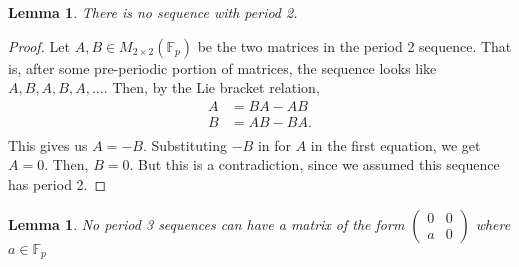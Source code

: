 \documentclass[12pt, letterpaper]{article}
\newtheorem{lemma}[theorem]{Lemma}
\theoremstyle{definition}
\newcommand{\F}{\mathbb{F}}
\newcommand{\M}{M_{2\times 2}(\mathbb{F}_p)}
\begin{document}
\begin{lemma}
There is no sequence with period 2.
\end{lemma}

\begin{proof}
Let $A,B \in \M$ be the two matrices in the period 2 sequence. That is, after some pre-periodic portion of matrices, the sequence looks like $A,B,A,B,A,\dots$. Then, by the Lie bracket relation,
\begin{align*}
A &= BA-AB \\
B &= AB-BA. \\
\end{align*}
This gives us $A=-B$. Substituting $-B$ in for $A$ in the first equation, we get $A=0$. Then, $B=0$. But this is a contradiction, since we assumed this sequence has period 2.
\end{proof}


\begin{lemma}
No period 3 sequences can have a matrix of the form
$\begin{pmatrix}
0 & 0 \\
a & 0
\end{pmatrix}$ where $a \in \F_p$
\end{lemma}
\end{document}
